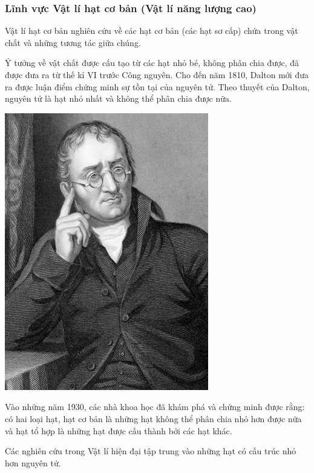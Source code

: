 \subsubsection{Lĩnh vực Vật lí hạt cơ bản (Vật lí năng lượng cao)}
Vật lí hạt cơ bản nghiên cứu về các hạt cơ bản (các hạt sơ cấp) chứa trong vật chất và những tương tác giữa chúng.

\begin{minipage}[l]{0.6\textwidth}
Ý tưởng về vật chất được cấu tạo từ các hạt nhỏ bé, không phân chia được, đã được đưa ra từ thế kỉ VI trước Công nguyên. Cho đến năm 1810, Dalton mới đưa ra được luận điểm chứng minh sự tồn tại của nguyên tử. Theo thuyết của Dalton, nguyên tử là hạt nhỏ nhất và không thể phân chia được nữa.
\end{minipage}
\begin{minipage}[r]{0.4\textwidth}
\begin{center}
	\includegraphics[scale=0.4]{../figs/G10-002-5.png}
\end{center}
\end{minipage}

Vào những năm 1930, các nhà khoa học đã khám phá và chứng minh được rằng: có hai loại hạt, hạt cơ bản là những hạt không thể phân chia nhỏ hơn được nữa và hạt tổ hợp là những hạt được cấu thành bởi các hạt khác.

Các nghiên cứu trong Vật lí hiện đại tập trung vào những hạt có cấu trúc nhỏ hơn nguyên tử.

